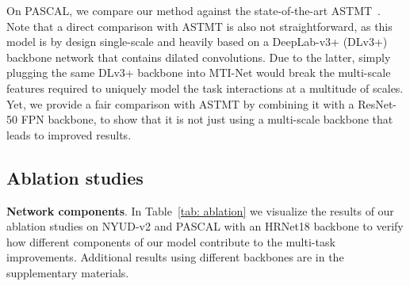 \documentclass[runningheads]{llncs}
\begin{document}
On PASCAL, we compare our method against the state-of-the-art ASTMT~\cite{maninis2019attentive}. Note that a direct comparison with ASTMT is also not straightforward, as this model is by design single-scale and heavily based on a DeepLab-v3+ (DLv3+) backbone network that contains dilated convolutions. Due to the latter, simply plugging the same DLv3+ backbone into MTI-Net would break the multi-scale features required to uniquely model the task interactions at a multitude of scales. Yet, we provide a fair comparison with ASTMT by combining it with a ResNet-50 FPN backbone, to show that it is not just using a multi-scale backbone that leads to improved results.

\subsection{Ablation studies}

\noindent\textbf{Network components}. 
In Table~\ref{tab: ablation} we visualize the results of our ablation studies on NYUD-v2 and PASCAL with an HRNet18 backbone to verify how different components of our model contribute to the multi-task improvements. Additional results using different backbones are in the supplementary materials. 
\end{document}
